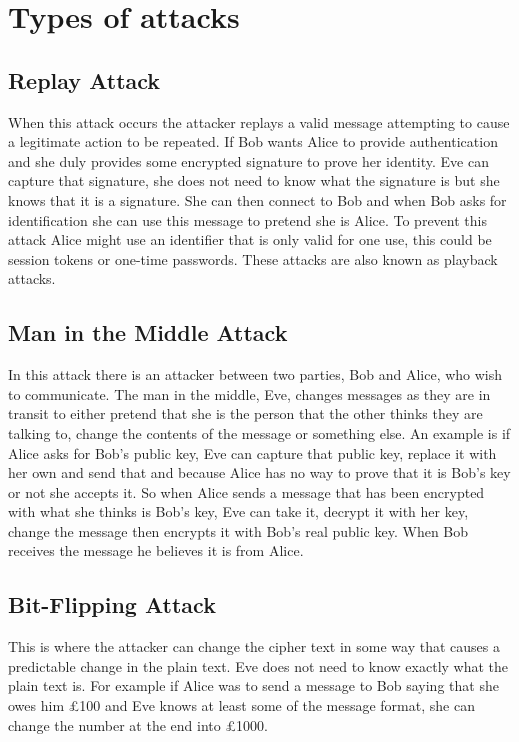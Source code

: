 
\section{Types of attacks}

\subsection{Replay Attack}

When this attack occurs the attacker replays a valid message attempting to cause a legitimate action to be repeated. If Bob wants Alice to provide authentication and she duly provides some encrypted signature to prove her identity. Eve can capture that signature, she does not need to know what the signature is but she knows that it is a signature. She can then connect to Bob and when Bob asks for identification she can use this message to pretend she is Alice. To prevent this attack Alice might use an identifier that is only valid for one use, this could be session tokens or one-time passwords. These attacks are also known as playback attacks.

\subsection{Man in the Middle Attack}
In this attack there is an attacker between two parties, Bob and Alice, who wish to communicate. The man in the middle, Eve, changes messages as they are in transit to either pretend that she is the person that the other thinks they are talking to, change the contents of the message or something else. An example is if Alice asks for Bob's public key, Eve can capture that public key, replace it with her own and send that and because Alice has no way to prove that it is Bob's key or not she accepts it. So when Alice sends a message that has been encrypted with what she thinks is Bob's key, Eve can take it, decrypt it with her key, change the message then encrypts it with Bob's real public key. When Bob receives the message he believes it is from Alice.

\subsection{Bit-Flipping Attack}
This is where the attacker can change the cipher text in some way that causes a predictable change in the plain text. Eve does not need to know exactly what the plain text is. For example if Alice was to send a message to Bob saying that she owes him £100 and Eve knows at least some of the message format, she can change the number at the end into £1000. 

